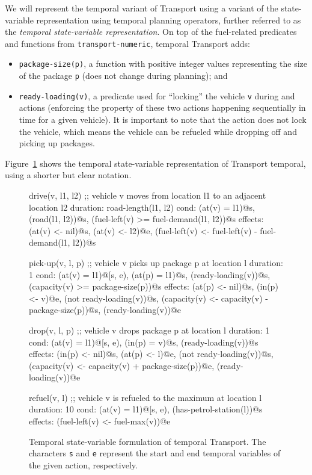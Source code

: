 We will represent the temporal variant of Transport using a variant of the state-variable representation using temporal planning operators, further referred to as the \textit{temporal state-variable representation}.
On top of the fuel-related predicates and functions from \verb+transport-numeric+, temporal Transport adds:
\begin{itemize}
\item \verb+package-size(p)+, a function with positive integer values representing the size of the package \verb+p+ (does not change during planning); and
\item \verb+ready-loading(v)+, a predicate used for ``locking'' the vehicle \verb+v+ during \pickup{} and \drop{} actions (enforcing the property of these two actions happening sequentially in time for a given vehicle). It is important to note that the  action does not
lock the vehicle, which means the vehicle can be refueled while dropping off and picking up packages.
\end{itemize}
Figure~\ref{code:statevar-temporal} shows the temporal state-variable representation of Transport temporal, using a shorter but clear notation.

\begin{figure}[tb]
\begin{code}
drive(v, l1, l2)
  ;; vehicle v moves from location l1 to an adjacent location l2
  duration: road-length(l1, l2)
  cond: (at(v) = l1)@s, (road(l1, l2))@s,
        (fuel-left(v) >= fuel-demand(l1, l2))@s
  effects: (at(v) <- nil)@s, (at(v) <- l2)@e,
           (fuel-left(v) <- fuel-left(v) - fuel-demand(l1, l2))@s

pick-up(v, l, p)
  ;; vehicle v picks up package p at location l
  duration: 1
  cond: (at(v) = l1)@[s, e), (at(p) = l1)@s, (ready-loading(v))@s,
        (capacity(v) >= package-size(p))@s
  effects: (at(p) <- nil)@s, (in(p) <- v)@e, (not ready-loading(v))@s,
           (capacity(v) <- capacity(v) - package-size(p))@s,
           (ready-loading(v))@e
  
drop(v, l, p)
  ;; vehicle v drops package p at location l
  duration: 1
  cond: (at(v) = l1)@[s, e), (in(p) = v)@s, (ready-loading(v))@s
  effects: (in(p) <- nil)@s, (at(p) <- l)@e, (not ready-loading(v))@s,
           (capacity(v) <- capacity(v) + package-size(p))@e,
           (ready-loading(v))@e
  
refuel(v, l)
  ;; vehicle v is refueled to the maximum at location l
  duration: 10
  cond: (at(v) = l1)@[s, e), (has-petrol-station(l))@s
  effects: (fuel-left(v) <- fuel-max(v))@e
\end{code}
\caption[State-variable formulation of temporal Transport.]{Temporal state-variable formulation of temporal Transport. The characters \texttt{s} and \texttt{e} represent the start and end temporal variables of the given action, respectively.}
\label{code:statevar-temporal}
\end{figure}

